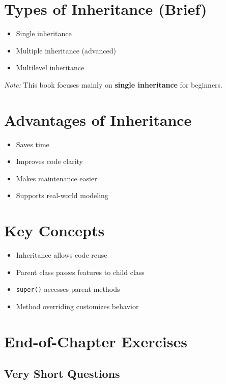 \section{Types of Inheritance (Brief)}

\begin{itemize}
    \item Single inheritance
    \item Multiple inheritance (advanced)
    \item Multilevel inheritance
\end{itemize}

\textit{Note:} This book focuses mainly on \textbf{single inheritance} for beginners.

\section{Advantages of Inheritance}

\begin{itemize}
    \item Saves time
    \item Improves code clarity
    \item Makes maintenance easier
    \item Supports real-world modeling
\end{itemize}

\section{Key Concepts}

\begin{itemize}
    \item Inheritance allows code reuse
    \item Parent class passes features to child class
    \item \texttt{super()} accesses parent methods
    \item Method overriding customizes behavior
\end{itemize}

\section{End-of-Chapter Exercises}

\subsection{Very Short Questions}

